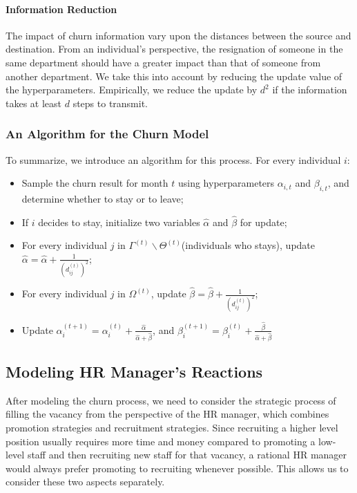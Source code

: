 \documentclass[tcn = 37075, sheet = false, abstract = false]{mcmthesis}
\begin{document}
\paragraph{Information Reduction} The impact of churn information vary upon the distances between the source and destination. From an individual's perspective, the resignation of someone in the same department should have a greater impact than that of someone from another department. We take this into account by reducing the update value of the hyperparameters. Empirically, we reduce the update by $d^2$ if the information takes at least $d$ steps to transmit. 

\subsubsection{An Algorithm for the Churn Model}
To summarize, we introduce an algorithm for this process. For every individual $i$:
\begin{itemize}
\item Sample the churn result for month $t$ using hyperparameters $\alpha_{i,t}$ and $\beta_{i,t}$, and determine whether to stay or to leave;
\item If $i$ decides to stay, initialize two variables $\hat{\alpha}$ and $\hat{\beta}$ for update;
\item For every individual $j$ in $\Gamma^{(t)} \backslash \Theta^{(t)}$(individuals who stays), update $\hat{\alpha} = \hat{\alpha} + \frac{1}{(d_{ij}^{(t)})^2}$;
\item For every individual $j$ in $\Omega^{(t)}$, update $ \hat{\beta} = \hat{\beta} + \frac{1}{(d_{ij}^{(t)})^2}$;
\item Update $ \alpha_{i}^{(t+1)}=\alpha_{i}^{(t)}+\frac{\hat{\alpha}}{\hat{\alpha}+\hat{\beta}}$, and $ \beta_{i}^{(t+1)}=\beta_{i}^{(t)}+\frac{\hat{\beta}}{\hat{\alpha}+\hat{\beta}}$
\end{itemize}

\subsection{Modeling HR Manager's Reactions}

After modeling the churn process, we need to consider the strategic process of filling the vacancy from the perspective of the HR manager, which combines promotion strategies and recruitment strategies. Since recruiting a higher level position usually requires more time and money compared to promoting a low-level staff and then recruiting new staff for that vacancy, a rational HR manager would always prefer promoting to recruiting whenever possible. This allows us to consider these two aspects separately.
\end{document}
